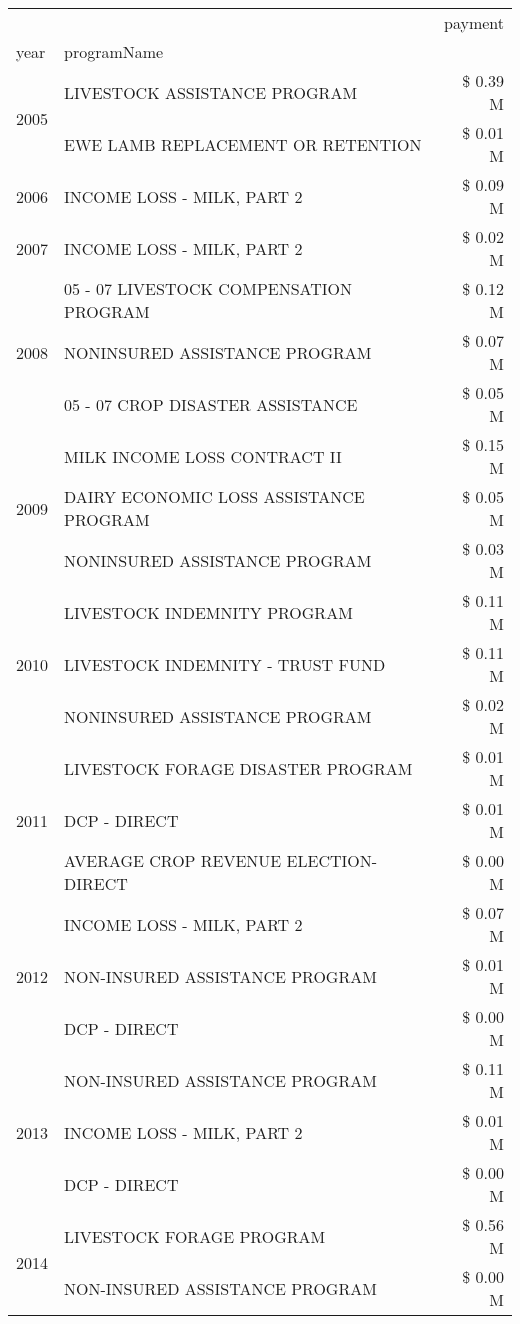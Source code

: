 \begin{tabular}{llr}
\toprule
 &  & payment \\
year & programName &  \\
\midrule
\multirow[t]{2}{*}{2005} & LIVESTOCK ASSISTANCE PROGRAM & \$ 0.39 M \\
 & EWE LAMB REPLACEMENT OR RETENTION & \$ 0.01 M \\
\cline{1-3}
2006 & INCOME LOSS - MILK, PART 2 & \$ 0.09 M \\
\cline{1-3}
2007 & INCOME LOSS - MILK, PART 2 & \$ 0.02 M \\
\cline{1-3}
\multirow[t]{3}{*}{2008} & 05 - 07 LIVESTOCK COMPENSATION PROGRAM & \$ 0.12 M \\
 & NONINSURED ASSISTANCE PROGRAM & \$ 0.07 M \\
 & 05 - 07 CROP DISASTER ASSISTANCE & \$ 0.05 M \\
\cline{1-3}
\multirow[t]{3}{*}{2009} & MILK INCOME LOSS CONTRACT II & \$ 0.15 M \\
 & DAIRY ECONOMIC LOSS ASSISTANCE PROGRAM & \$ 0.05 M \\
 & NONINSURED ASSISTANCE PROGRAM & \$ 0.03 M \\
\cline{1-3}
\multirow[t]{3}{*}{2010} & LIVESTOCK INDEMNITY PROGRAM & \$ 0.11 M \\
 & LIVESTOCK INDEMNITY - TRUST FUND & \$ 0.11 M \\
 & NONINSURED ASSISTANCE PROGRAM & \$ 0.02 M \\
\cline{1-3}
\multirow[t]{3}{*}{2011} & LIVESTOCK FORAGE DISASTER PROGRAM & \$ 0.01 M \\
 & DCP - DIRECT & \$ 0.01 M \\
 & AVERAGE CROP REVENUE ELECTION-DIRECT & \$ 0.00 M \\
\cline{1-3}
\multirow[t]{3}{*}{2012} & INCOME LOSS - MILK, PART 2 & \$ 0.07 M \\
 & NON-INSURED ASSISTANCE PROGRAM & \$ 0.01 M \\
 & DCP - DIRECT & \$ 0.00 M \\
\cline{1-3}
\multirow[t]{3}{*}{2013} & NON-INSURED ASSISTANCE PROGRAM & \$ 0.11 M \\
 & INCOME LOSS - MILK, PART 2 & \$ 0.01 M \\
 & DCP - DIRECT & \$ 0.00 M \\
\cline{1-3}
\multirow[t]{2}{*}{2014} & LIVESTOCK FORAGE PROGRAM & \$ 0.56 M \\
 & NON-INSURED ASSISTANCE PROGRAM & \$ 0.00 M \\
\cline{1-3}

\end{tabular}
